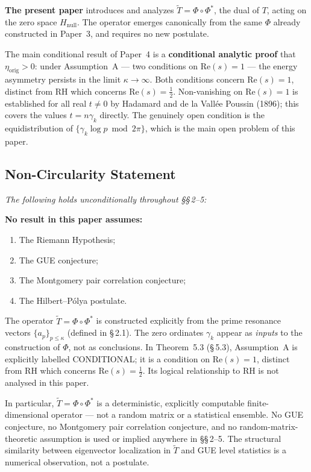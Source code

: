 \documentclass[11pt]{article}
\newcommand{\Hnull}{H_{\mathrm{null}}}
\newcommand{\etaorig}{\eta_{\mathrm{orig}}}
\newcommand{\Tt}{\widetilde{T}}
\begin{document}
\textbf{The present paper} introduces and analyzes
$\Tt = \Phi\circ\Phi^*$, the dual of $T$, acting on the zero space
$\Hnull$.
The operator emerges canonically from the same $\Phi$ already constructed
in Paper~3, and requires no new postulate.

The main conditional result of Paper~4
is a \textbf{conditional analytic proof} that $\etaorig > 0$: under Assumption~A --- two conditions
on $\mathrm{Re}(s)=1$ --- the energy asymmetry persists in the limit
$\kappa\to\infty$.
Both conditions concern $\mathrm{Re}(s)=1$, distinct from RH which concerns
$\mathrm{Re}(s)=\tfrac{1}{2}$.
Non-vanishing on $\mathrm{Re}(s)=1$ is established for all real $t\neq 0$
by Hadamard and de la Vall\'ee Poussin (1896); this covers the values
$t = n\gamma_k$ directly.
The genuinely open condition is the equidistribution of
$\{\gamma_k\log p\bmod 2\pi\}$, which is the main open problem of
this paper.

\subsection{Non-Circularity Statement}

\emph{The following holds unconditionally throughout \S\S\,2--5:}

\textbf{No result in this paper assumes:}
\begin{enumerate}[label=(\roman*)]
\item The Riemann Hypothesis;
\item The GUE conjecture;
\item The Montgomery pair correlation conjecture;
\item The Hilbert--P\'olya postulate.
\end{enumerate}

The operator $\Tt = \Phi\circ\Phi^*$ is constructed explicitly from
the prime resonance vectors $\{a_p\}_{p\leq\kappa}$ (defined in \S\,2.1).
The zero ordinates $\gamma_k$ appear as \emph{inputs} to the construction
of $\Phi$, not as conclusions.
In Theorem~5.3 (\S\,5.3), Assumption~A is explicitly
labelled CONDITIONAL; it is a condition on $\mathrm{Re}(s)=1$, distinct
from RH which concerns $\mathrm{Re}(s)=\tfrac{1}{2}$.
Its logical relationship to RH is not analysed in this paper.

In particular, $\Tt = \Phi\circ\Phi^*$ is a deterministic,
explicitly computable finite-dimensional operator --- not a random matrix
or a statistical ensemble.
No GUE conjecture, no Montgomery pair correlation conjecture,
and no random-matrix-theoretic assumption is used or implied anywhere
in \S\S\,2--5.
The structural similarity between eigenvector localization in $\Tt$ and
GUE level statistics is a numerical observation, not a postulate.
\end{document}
